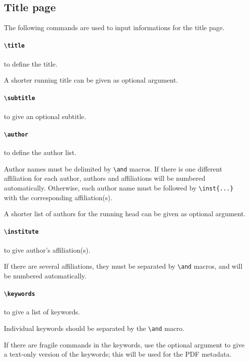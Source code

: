 \documentclass{iacrtrans}
\begin{document}
\subsection{Title page}

The following commands are used to input informations for the title page.

\paragraph{\texttt{\textbackslash title}} to define the title.

A shorter running title can be given as optional argument.

\paragraph{\texttt{\textbackslash subtitle}} to give an optional
subtitle.

\paragraph{\texttt{\textbackslash author}} to define the author list.

Author names must be delimited by \verb+\and+ macros.  If there is one
different affiliation for each author, authors and affiliations will be
numbered automatically.  Otherwise, each author name must be followed by
\verb+\inst{...}+ with the corresponding affiliation(s).

A shorter list of authors for the running head can be given as
optional argument.

\paragraph{\texttt{\textbackslash institute}} to give author's affiliation(s).

If there are several affiliations, they must be separated by
\verb+\and+ macros, and will be numbered automatically.

\paragraph{\texttt{\textbackslash keywords}} to give a list of
keywords.

Individual keywords should be separated by the \verb+\and+ macro.

If there are fragile commands in the keywords, use the optional argument
to give a text-only version of the keywords; this will be used for the
PDF metadata.
\end{document}
